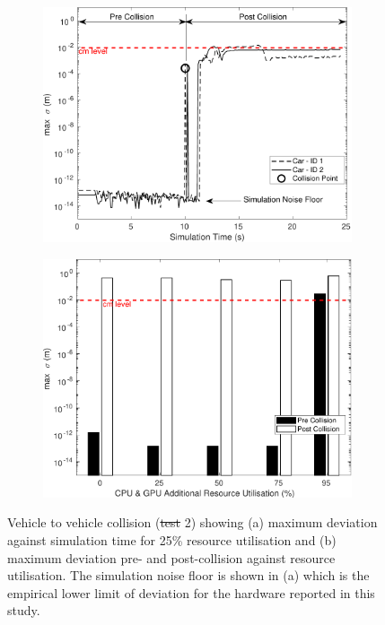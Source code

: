 \documentclass[letterpaper, 10 pt, journal, twoside]{IEEEtran}
\providecommand{\DIFaddtex}[1]{{\protect\color{blue}\uwave{#1}}} %
\providecommand{\DIFdeltex}[1]{{\protect\color{red}\sout{#1}}}                      %
\providecommand{\DIFaddFL}[1]{\DIFadd{#1}} %
\providecommand{\DIFdelFL}[1]{\DIFdel{#1}} %
\providecommand{\DIFaddbeginFL}{} %
\providecommand{\DIFaddendFL}{} %
\providecommand{\DIFdelbeginFL}{} %
\providecommand{\DIFdelendFL}{} %
\providecommand{\DIFadd}[1]{\texorpdfstring{\DIFaddtex{#1}}{#1}} %
\providecommand{\DIFdel}[1]{\texorpdfstring{\DIFdeltex{#1}}{}} %
\begin{document}
\begin{figure}[t]
    \centering
    \begin{subfigure}{.49\textwidth}
        \includegraphics[width=1\textwidth]{Other/Figures/CarsCollisionCG25_V4.pdf}
        \caption{}
        \label{CarsCollisionCG25}
    \end{subfigure}
    \begin{subfigure}{.49\textwidth}
        \includegraphics[width=1\textwidth]{Other/Figures/CarsCollisionPrePostV5.pdf}
        \caption{}
        \label{CarsCollisionPrePost}
    \end{subfigure}
    \caption{Vehicle to vehicle collision (\DIFdelbeginFL \DIFdelFL{test }\DIFdelendFL \DIFaddbeginFL \DIFaddFL{Test }\DIFaddendFL 2) showing (a) maximum deviation against simulation time for 25\% resource utilisation and (b) maximum deviation pre- and post-collision against resource utilisation. The simulation noise floor is shown in (a) which is the empirical lower limit of deviation for the hardware reported in this study.}
\end{figure}
\end{document}
